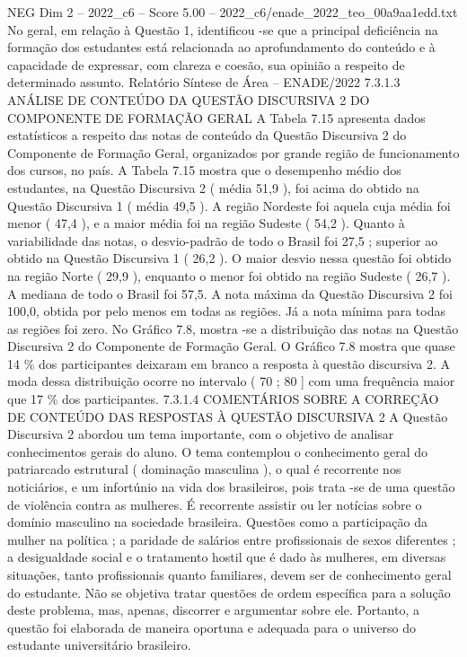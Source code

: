 \begin{textsample}{NEG Dim 2 – 2022\_c6 – Score 5.00 – 2022\_c6/enade\_2022\_teo\_00a9aa1edd.txt}
No geral, em relação à Questão 1, identificou -se que a principal deficiência na formação dos estudantes está relacionada ao aprofundamento do conteúdo e à capacidade de expressar, com clareza e coesão, sua opinião a respeito de determinado assunto.
Relatório Síntese de Área – ENADE/2022 7.3.1.3 ANÁLISE DE CONTEÚDO DA QUESTÃO DISCURSIVA 2 DO COMPONENTE DE FORMAÇÃO GERAL A Tabela 7.15 apresenta dados estatísticos a respeito das notas de conteúdo da Questão Discursiva 2 do Componente de Formação Geral, organizados por grande região de funcionamento dos cursos, no país.
A Tabela 7.15 mostra que o desempenho médio dos estudantes, na Questão Discursiva 2 ( média 51,9 ), foi acima do obtido na Questão Discursiva 1 ( média 49,5 ).
A região Nordeste foi aquela cuja média foi menor ( 47,4 ), e a maior média foi na região Sudeste ( 54,2 ).
Quanto à variabilidade das notas, o desvio-padrão de todo o Brasil foi 27,5 ; superior ao obtido na Questão Discursiva 1 ( 26,2 ).
O maior desvio nessa questão foi obtido na região Norte ( 29,9 ), enquanto o menor foi obtido na região Sudeste ( 26,7 ).
A mediana de todo o Brasil foi 57,5.
A nota máxima da Questão Discursiva 2 foi 100,0, obtida por pelo menos em todas as regiões.
Já a nota mínima para todas as regiões foi zero.
No Gráfico 7.8, mostra -se a distribuição das notas na Questão Discursiva 2 do Componente de Formação Geral.
O Gráfico 7.8 mostra que quase 14 \% dos participantes deixaram em branco a resposta à questão discursiva 2.
A moda dessa distribuição ocorre no intervalo ( 70 ; 80 ] com uma frequência maior que 17 \% dos participantes. 7.3.1.4 COMENTÁRIOS SOBRE A CORREÇÃO DE CONTEÚDO DAS RESPOSTAS À QUESTÃO DISCURSIVA 2 A Questão Discursiva 2 abordou um tema importante, com o objetivo de analisar conhecimentos gerais do aluno.
O tema contemplou o conhecimento geral do patriarcado estrutural ( dominação masculina ), o qual é recorrente nos noticiários, e um infortúnio na vida dos brasileiros, pois trata -se de uma questão de violência contra as mulheres.
É recorrente assistir ou ler notícias sobre o domínio masculino na sociedade brasileira.
Questões como a participação da mulher na política ; a paridade de salários entre profissionais de sexos diferentes ; a desigualdade social e o tratamento hostil que é dado às mulheres, em diversas situações, tanto profissionais quanto familiares, devem ser de conhecimento geral do estudante.
Não se objetiva tratar questões de ordem específica para a solução deste problema, mas, apenas, discorrer e argumentar sobre ele.
Portanto, a questão foi elaborada de maneira oportuna e adequada para o universo do estudante universitário brasileiro.

\end{textsample}
